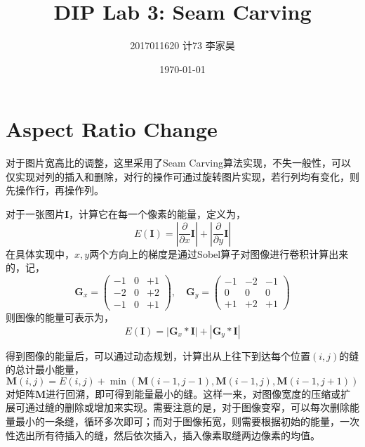 \documentclass[12pt,a4paper]{article}
\title{DIP Lab 3: Seam Carving}
\author{2017011620 \quad 计73 \quad 李家昊}
\date{\today}
\begin{document}
\maketitle

\section{Aspect Ratio Change}

对于图片宽高比的调整，这里采用了Seam Carving算法\cite{avidan2007seam}实现，不失一般性，可以仅实现对列的插入和删除，对行的操作可通过旋转图片实现，若行列均有变化，则先操作行，再操作列。

对于一张图片$\mathbf{I}$，计算它在每一个像素的能量，定义为，
\begin{equation}
    E(\mathbf{I}) = \left|\frac{\partial}{\partial x} \mathbf{I}\right| + \left|\frac{\partial}{\partial y} \mathbf{I}\right| 
\end{equation}
在具体实现中，$x,y$两个方向上的梯度是通过Sobel算子对图像进行卷积计算出来的，记，
\begin{equation}
    \mathbf{G}_x = \left(
    \begin{matrix}
        -1 & 0 & +1 \\
        -2 & 0 & +2 \\
        -1 & 0 & +1
    \end{matrix}
    \right),
    \quad
    \mathbf{G}_y = \left(
    \begin{matrix}
        -1 & -2 & -1 \\
        0 & 0 & 0 \\
        +1 & +2 & +1
    \end{matrix}
    \right)
\end{equation}
则图像的能量可表示为，
\begin{equation}
    E(\mathbf{I}) = |\mathbf{G}_x * \mathbf{I}| + |\mathbf{G}_y * \mathbf{I}|
\end{equation}

得到图像的能量后，可以通过动态规划，计算出从上往下到达每个位置$(i,j)$的缝的总计最小能量，
\begin{equation}
    \mathbf{M}(i,j) = E(i, j) + \min(\mathbf{M}(i-1,j-1), \mathbf{M}(i-1,j), \mathbf{M}(i-1, j+1))
\end{equation}
对矩阵$\mathbf{M}$进行回溯，即可得到能量最小的缝。这样一来，对图像宽度的压缩或扩展可通过缝的删除或增加来实现。需要注意的是，对于图像变窄，可以每次删除能量最小的一条缝，循环多次即可；而对于图像拓宽，则需要根据初始的能量，一次性选出所有待插入的缝，然后依次插入，插入像素取缝两边像素的均值。
\end{document}
